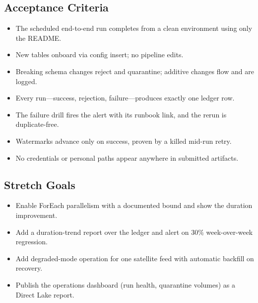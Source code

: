 \subsection*{Acceptance Criteria}
\begin{itemize}
    \item[\(\square\)] The scheduled end-to-end run completes from a clean environment using only the README.
    \item[\(\square\)] New tables onboard via config insert; no pipeline edits.
    \item[\(\square\)] Breaking schema changes reject and quarantine; additive changes flow and are logged.
    \item[\(\square\)] Every run---success, rejection, failure---produces exactly one ledger row.
    \item[\(\square\)] The failure drill fires the alert with its runbook link, and the rerun is duplicate-free.
    \item[\(\square\)] Watermarks advance only on success, proven by a killed mid-run retry.
    \item[\(\square\)] No credentials or personal paths appear anywhere in submitted artifacts.
\end{itemize}

\subsection*{Stretch Goals}
\begin{itemize}
    \item Enable ForEach parallelism with a documented bound and show the duration improvement.
    \item Add a duration-trend report over the ledger and alert on 30\% week-over-week regression.
    \item Add degraded-mode operation for one satellite feed with automatic backfill on recovery.
    \item Publish the operations dashboard (run health, quarantine volumes) as a Direct Lake report.
\end{itemize}
